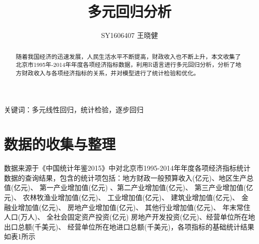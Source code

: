 \documentclass [a4paper]{article}
\author {SY1606407 王晓健}
\title {多元回归分析}
\date{}
\begin{document}
\maketitle
\begin{abstract}
随着我国经济的迅速发展，人民生活水平不断提高，财政收入也不断上升，本文收集了北京市1995年-2014年年度各项经济指标数据，利用R语言进行多元回归分析，分析了地方财政收入与各项经济指标的关系，并对模型进行了统计检验和优化。
\end{abstract}

\begin{keywords}
关键词：多元线性回归，统计检验，逐步回归
\end{keywords}

\section{数据的收集与整理}
数据来源于《中国统计年鉴2015》中对北京市1995-2014年年度各项经济指标统计数据的查询结果，包含的统计项包括：地方财政一般预算收入(亿元)、地区生产总值(亿元)、	第一产业增加值(亿元)	、第二产业增加值(亿元)、	第三产业增加值(亿元)、	农林牧渔业增加值(亿元)、	工业增加值(亿元)、	建筑业增加值(亿元)、	金融业增加值(亿元)、	房地产业增加值(亿元)、	其他行业增加值(亿元)、	年末常住人口(万人)、	全社会固定资产投资(亿元)	房地产开发投资(亿元)、经营单位所在地出口总额(千美元)、	经营单位所在地进口总额(千美元)，各项指标的基础统计结果如表1所示
\end{document}
